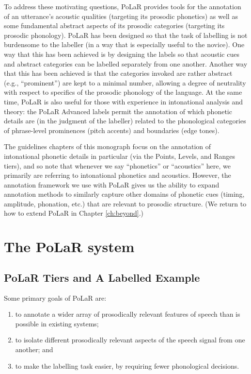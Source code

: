 \documentclass[11pt, twoside]{memoir}
\begin{document}
To address these motivating questions, PoLaR provides tools for the annotation of an utterance’s acoustic qualities (targeting its prosodic phonetics) as well as some fundamental abstract aspects of its prosodic categories (targeting its prosodic phonology). PoLaR has been designed so that the task of labelling is not burdensome to the labeller (in a way that is especially useful to the novice). One way that this has been achieved is by designing the labels so that acoustic cues and abstract categories can be labelled separately from one another. Another way that this has been achieved is that the categories invoked are rather abstract (e.g., “prominent”) are kept to a minimal number, allowing a degree of neutrality with respect to specifics of the prosodic phonology of the language. At the same time, PoLaR is also useful for those with experience in intonational analysis and theory: the PoLaR Advanced labels permit the annotation of which phonetic details are (in the judgment of the labeller) related to the phonological categories of phrase-level prominences (pitch accents) and boundaries (edge tones).

The guidelines chapters of this monograph focus on the annotation of intonational phonetic details in particular (via the Points, Levels, and Ranges tiers), and so note that whenever we say “phonetics” or “acoustics” here, we primarily are referring to intonational phonetics and acoustics.  However, the annotation framework we use with PoLaR gives us the ability to expand annotation methods to similarly capture other domains of phonetic cues (timing, amplitude, phonation, etc.) that are relevant to prosodic structure. (We return to how to extend PoLaR in Chapter \ref{ch:beyond}.)

\section{The PoLaR system}\label{sec:polar-system}

\subsection{PoLaR Tiers and A Labelled Example}\label{sec:polar-tiers-and-a-labelled-example}

Some primary goals of PoLaR are:

\begin{enumerate}
\item to annotate a wider array of prosodically relevant features of speech than is possible in existing systems;
\item to isolate different prosodically relevant aspects of the speech signal from one another; and
\item to make the labelling task easier, by requiring fewer phonological decisions.
\end{enumerate}
\end{document}
